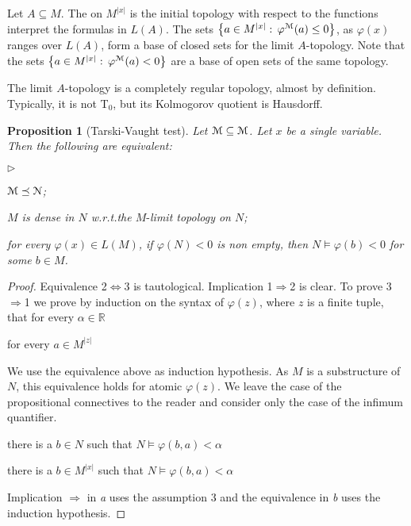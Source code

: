 \documentclass[12pt,letterpaper,oneside,reqno]{amsart}
\newcommand{\mylabel}[1]{{#1}\hfill}
\renewenvironment{itemize}
  {\begin{list}{$\triangleright$}{%
   \setlength{\parskip}{0mm}
   \setlength{\topsep}{.2\baselineskip}
   \setlength{\rightmargin}{0mm}
   \setlength{\listparindent}{0mm}
   \setlength{\itemindent}{0mm}
   \setlength{\labelwidth}{3ex}
   \setlength{\itemsep}{.2\baselineskip}
   \setlength{\parsep}{.2\baselineskip}
   \setlength{\partopsep}{0mm}
   \setlength{\labelsep}{1ex}
   \setlength{\leftmargin}{\labelwidth+\labelsep}
   \let\makelabel\mylabel}}{%
   \end{list}}
\theoremstyle{plain}
\newtheorem{proposition}[theorem]{Proposition}
\theoremstyle{remark}
\renewcommand*{\emph}[1]{%
   \smash{\tikz[baseline]\node[rectangle, fill=olive!25, rounded corners, inner xsep=0.5ex, inner ysep=0.2ex, anchor=base, minimum height = 2.7ex]{#1};}}
\begin{document}
Let $A\subseteq M$.
The \emph{limit $A$-topology\/} on $M^{|x|}$ is the initial topology with respect to the functions interpret the formulas in $L(A)$.
The sets $\big\{a\in M^{|x|}:\, \varphi^{\EuScript M}(a)\le0\big\}$, as $\varphi(x)$ ranges over $L(A)$, form a base of closed sets for the limit $A$-topology.
Note that the sets $\big\{a\in M^{|x|}:\, \varphi^{\EuScript M}(a)<0\big\}$ are a base of open sets of the same topology.

The limit $A$-topology is a completely regular topology, almost by definition.
Typically, it is not T$_0$, but its Kolmogorov quotient is Hausdorff.

\begin{proposition}[Tarski-Vaught test]\label{prop_Tarski-Vaught} Let ${\EuScript M}\subseteq{\EuScript M}$.
  Let $x$ be a single variable.
  Then the following are equivalent:
  \begin{itemize}
    \item[1.] ${\EuScript M}\preceq{\EuScript N}$;
    \item[2.] $M$ is dense in $N$ w.r.t.\@ the $M\mbox{-}$limit topology on $N$;
    \item[3.] for every $\varphi(x)\in L(M)$, if $\varphi(N)<0$ is non empty, then $N\models\varphi(b)<0$ for some $b\in M$.
  \end{itemize}
\end{proposition}
\begin{proof}
  Equivalence 2$\Leftrightarrow$3 is tautological.
  Implication 1$\Rightarrow$2 is clear.
  To prove 3$\Rightarrow$1 we prove by induction on the syntax of $\varphi(z)$, where $z$ is a finite tuple, that for every $\alpha\in{\mathds R}$

   \hfill for every $a\in M^{|z|}$

  We use the equivalence above as induction hypothesis.
  As $M$ is a substructure of $N$, this equivalence holds for atomic $\varphi(z)$.
  We leave the case of the propositional connectives to the reader and consider only the case of the infimum quantifier.

   there is a $b\in N$ such that $N\models\varphi(b,a)<\alpha$

   there is a $b\in M^{|x|}$ such that $N\models\varphi(b,a)<\alpha$


  Implication $\Rightarrow$ in \textit{a} uses the assumption 3 and the equivalence in \textit{b} uses the induction hypothesis.
\end{proof}
\end{document}
